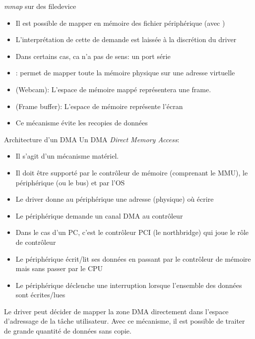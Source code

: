 \begin{frame}[fragile=singleslide]{\emph{mmap} sur des filedevice}
  \begin{itemize}
  \item Il est possible de  mapper en mémoire des fichier périphérique
    (avec )
  \item  L'interprétation  de  cette  de  demande  est  laissée  à  la
    discrétion du driver
  \item Dans certains cas, ca n'a pas de sens: un port série
  \item {}:  permet de  mapper toute la  mémoire physique
    sur une adresse virtuelle
  \item  {}   (Webcam):  L'espace  de   mémoire  mappé
    représentera une frame.
  \item {} (Frame buffer): L'espace de mémoire représente
    l'écran
  \item Ce mécanisme évite les recopies de données
  \end{itemize}
\end{frame}

\begin{frame}[fragile=singleslide]{Architecture d'un DMA}
  Un DMA \emph{Direct Memory Access}:
  \begin{itemize}
  \item Il s'agit d'un mécanisme matériel.
  \item Il doit être supporté par le contrôleur de mémoire (comprenant
    le MMU), le périphérique (ou le bus) et par l'OS
  \item  Le driver  donne au  périphérique une  adresse  (physique) où
    écrire
  \item Le périphérique demande un canal DMA au contrôleur
  \item Dans le cas d'un  PC, c'est le contrôleur PCI (le northbridge)
    qui joue le rôle de contrôleur
  \item  Le  périphérique écrit/lit  ses  données  en  passant par  le
    contrôleur de mémoire mais sans passer par le CPU
  \item Le périphérique  déclenche une interruption lorsque l'ensemble
    des données sont écrites/lues
  \end{itemize}
  Le  driver peut  décider  de  mapper la  zone  DMA directement  dans
  l'espace d'adressage de la  tâche utilisateur. Avec ce mécanisme, il
  est possible de traiter de grande quantité de données sans copie.
\end{frame}

